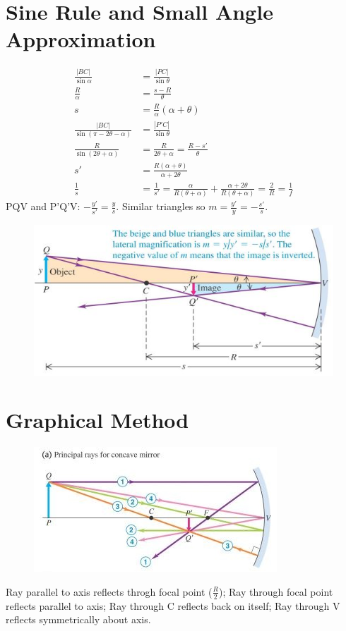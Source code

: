 \documentclass[a4paper, 11pt, normalem]{report}
\begin{document}
\section{Sine Rule and Small Angle Approximation}
\begin{align}
    \frac{|BC|}{\sin{\alpha}} &= \frac{|PC|}{\sin{\theta}} \\
    \frac{R}{\alpha} &= \frac{s - R}{\theta} \\
    s &= \frac{R}{\alpha}(\alpha + \theta) \\
    \frac{|BC|}{\sin{(\pi - 2\theta - \alpha)}} &= \frac{|P'C|}{\sin{\theta}}\\
    \frac{R}{\sin{(2\theta + \alpha)}} &= \frac{R}{2\theta + \alpha} = \frac{R - s'}{\theta} \\
    s' &= \frac{R(\alpha + \theta)}{\alpha + 2\theta} \\
    \frac{1}{s} &= \frac{1}{s'} = \frac{\alpha}{R(\theta + \alpha)} + \frac{\alpha + 2\theta}{R(\theta + \alpha)} = \frac{2}{R} = \frac{1}{f}
\end{align}
PQV and P'Q'V: $-\frac{y'}{s'} = \frac{y}{s}$.
Similar triangles so $m = \frac{y'}{y} = -\frac{s'}{s}$.
\begin{figure}[H]
    \centering
    \includegraphics[scale=0.8]{Reflect1.jpg}
\end{figure}

\section{Graphical Method}
\begin{figure}[H]
    \centering
    \includegraphics{Reflect2.jpg}
\end{figure}
Ray parallel to axis reflects throgh focal point ($\frac{R}{2}$); Ray through focal point reflects parallel to axis; Ray through C reflects back on itself; Ray through V reflects symmetrically about axis.
\end{document}
